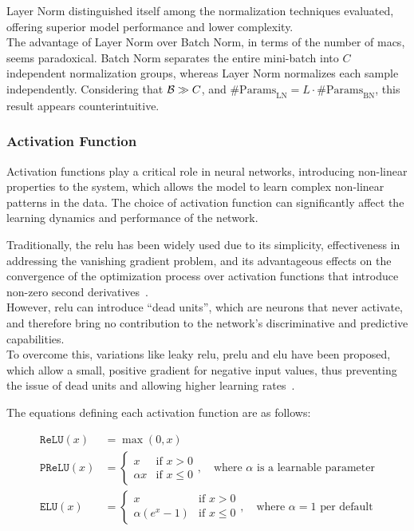 Layer Norm distinguished itself among the normalization techniques evaluated, offering superior model performance and lower complexity. \\
The advantage of Layer Norm over Batch Norm, in terms of the number of \glspl{mac}, seems paradoxical.
Batch Norm separates the entire mini-batch into \( C \) independent normalization groups, whereas Layer Norm normalizes
each sample independently. Considering that \( \mathcal{B} \gg C \), and \( \text{\#Params}_{\text{LN}} = L \cdot \text{\#Params}_{\text{BN}} \),
this result appears counterintuitive. \\



\subsubsection{Activation Function}
Activation functions play a critical role in neural networks, introducing non-linear properties to the system,
which allows the model to learn complex non-linear patterns in the data. The choice of activation function can
significantly affect the learning dynamics and performance of the network.

Traditionally, the \gls{relu} has been widely used due to its simplicity, effectiveness in addressing the vanishing
gradient problem, and its advantageous effects on the convergence of the optimization process over activation functions that
introduce non-zero second derivatives~\cite[Chapter 6.3.1]{dlbook}.\\
However, \gls{relu} can introduce ``dead units'', which are neurons that never activate, and therefore bring no contribution
to the network's discriminative and predictive capabilities.\\
To overcome this, variations like leaky \gls{relu}, \gls{prelu} and \gls{elu} have been proposed, which allow a small,
positive gradient for negative input values, thus preventing the issue of dead units and allowing higher learning rates~\cite{dyingRelu}.

The equations defining each activation function are as follows:

\begin{align}
    \texttt{ReLU}(x) &= \max(0, x) \label{eq:relu} \\
    \texttt{PReLU}(x) &= \begin{cases}
        x & \text{if } x > 0 \\
        \alpha x & \text{if } x \leq 0
    \end{cases}, \quad \text{where } \alpha \text{ is a learnable parameter} \label{eq:prelu} \\
    \texttt{ELU}(x) &= \begin{cases}
        x & \text{if } x > 0 \\
        \alpha \left( e^x - 1 \right) & \text{if } x \leq 0
    \end{cases}, \quad \text{where } \alpha = 1 \text{ per default}\label{eq:elu}
\end{align}

